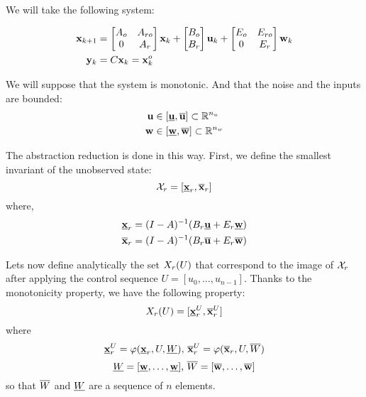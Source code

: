 We will take the following system:

\begin{equation}
\begin{aligned}
 \mathbf{x}_{k+1} &=
\begin{bmatrix} A_o&A_{ro}\\ 0& A_r \end{bmatrix}  \mathbf{x}_{k} + 
\begin{bmatrix} B_o\\ B_r \end{bmatrix}  \mathbf{u}_{k} + 
\begin{bmatrix} E_o & E_{ro} \\ 0 & E_r \end{bmatrix}  \mathbf{w}_{k}
\\
 \mathbf{y}_{k} &= C \mathbf{x}_{k} =  \mathbf{x}^o_k
\end{aligned}
\end{equation}

We will suppose that the system is monotonic. 
And that the noise and the inputs are bounded:
\begin{equation}
\begin{aligned}
 \mathbf{u} &\in [\underline{ \mathbf{u}},\overline{ \mathbf{u}}] \subset \mathbb{R}^{n_u}\\
 \mathbf{w} &\in [\underline{ \mathbf{w}},\overline{ \mathbf{w}}] \subset \mathbb{R}^{n_w}\\
\end{aligned}
\end{equation}

The abstraction reduction is done in this way. First, we define the smallest invariant of the unobserved state:
$$
\mathcal{X}_r = [\underline{ \mathbf{x}}_r,\overline{ \mathbf{x}}_r]
$$
where,
$$
\begin{aligned}
\underline{ \mathbf{x}}_r &= (I-A)^{-1} (B_r \underline{ \mathbf{u}} + E_r \underline{ \mathbf{w}})\\
\overline{ \mathbf{x}}_r &= (I-A)^{-1} (B_r \overline{ \mathbf{u}} + E_r \overline{ \mathbf{w}})
\end{aligned}
$$

Lets now define analytically the set $X_r(U)$ that correspond to the image of $\mathcal{X}_r$ after applying the control sequence $U = [u_0,\dots,u_{n-1}]$.
Thanks to the monotonicity property, we have the following property:
\newcommand{\xui}{\minf{\x}^U_r}
\newcommand{\xus}{\msup{\x}^U_r}
\newcommand{\xu}{\x^U_r}
$$\Xr(U) = [\xui,\xus]$$
where
$$\xui = \traj (\xrinf,U,\Winf)
\textrm{, }
\xus = \traj (\xrsup,U,\Wsup)$$
$$ \underline{W} = [\underline{ \mathbf{w}},\dots,\underline{ \mathbf{w}}]
\textrm{, }
\overline{W} = [\overline{ \mathbf{w}},\dots,\overline{ \mathbf{w}}]$$
so that $\overline{W}$ and $\underline{W}$ are a sequence of $n$ elements.


